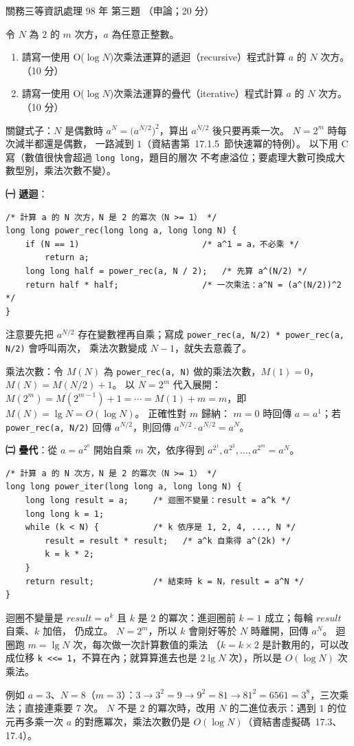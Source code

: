 \begin{pastexam}[label={px:gw3-098-ds-03}]{關務三等資訊處理 98 年 第三題}
（申論；20 分）

令 $N$ 為 2 的 $m$ 次方，$a$ 為任意正整數。
\begin{enumerate}[leftmargin=2.6em, labelsep=0.4em]
\item[㈠] 請寫一使用 O($\log N$)次乘法運算的遞迴（recursive）程式計算 $a$ 的 $N$ 次方。（10 分）
\item[㈡] 請寫一使用 O($\log N$)次乘法運算的疊代（iterative）程式計算 $a$ 的 $N$ 次方。（10 分）
\end{enumerate}
\end{pastexam}

\begin{pastsoln}
關鍵式子：$N$ 是偶數時 $a^N = \bigl(a^{N/2}\bigr)^2$，算出 $a^{N/2}$ 後只要再乘一次。 $N = 2^m$ 時每次減半都還是偶數，
一路減到 $1$（資結書第~17.1.5~節快速冪的特例）。 以下用 C 寫（數值很快會超過 \texttt{long long}，題目的層次
不考慮溢位；要處理大數可換成大數型別，乘法次數不變）。

\textbf{㈠ 遞迴}：
\begin{verbatim}
/* 計算 a 的 N 次方，N 是 2 的冪次（N >= 1） */
long long power_rec(long long a, long long N) {
    if (N == 1)                         /* a^1 = a，不必乘 */
        return a;
    long long half = power_rec(a, N / 2);   /* 先算 a^(N/2) */
    return half * half;                 /* 一次乘法：a^N = (a^(N/2))^2 */
}
\end{verbatim}
注意要先把 $a^{N/2}$ 存在變數裡再自乘；寫成 \texttt{power\_rec(a, N/2) * power\_rec(a, N/2)} 會呼叫兩次，
乘法次數變成 $N - 1$，就失去意義了。

乘法次數：令 $M(N)$ 為 \texttt{power\_rec(a, N)} 做的乘法次數，$M(1) = 0$，$M(N) = M(N/2) + 1$。 以 $N = 2^m$
代入展開：$M(2^m) = M(2^{m-1}) + 1 = \cdots = M(1) + m = m$，即 $M(N) = \lg N = O(\log N)$。 正確性對 $m$ 歸納：
$m = 0$ 時回傳 $a = a^1$；若 \texttt{power\_rec(a, N/2)} 回傳 $a^{N/2}$，則回傳 $a^{N/2} \cdot a^{N/2} = a^N$。

\textbf{㈡ 疊代}：從 $a = a^{2^0}$ 開始自乘 $m$ 次，依序得到 $a^{2^1}, a^{2^2}, \ldots, a^{2^m} = a^N$。
\begin{verbatim}
/* 計算 a 的 N 次方，N 是 2 的冪次（N >= 1） */
long long power_iter(long long a, long long N) {
    long long result = a;     /* 迴圈不變量：result = a^k */
    long long k = 1;
    while (k < N) {           /* k 依序是 1, 2, 4, ..., N */
        result = result * result;   /* a^k 自乘得 a^(2k) */
        k = k * 2;
    }
    return result;            /* 結束時 k = N，result = a^N */
}
\end{verbatim}
迴圈不變量是 $\mathit{result} = a^k$ 且 $k$ 是 $2$ 的冪次：進迴圈前 $k = 1$ 成立；每輪 $\mathit{result}$ 自乘、$k$ 加倍，
仍成立。 $N = 2^m$，所以 $k$ 會剛好等於 $N$ 時離開，回傳 $a^N$。 迴圈跑 $m = \lg N$ 次，每次做一次計算數值的乘法
（$k = k \times 2$ 是計數用的，可以改成位移 \texttt{k <<= 1}，不算在內；就算算進去也是 $2\lg N$ 次），所以是
$O(\log N)$ 次乘法。

例如 $a = 3$、$N = 8$（$m = 3$）：$3 \to 3^2 = 9 \to 9^2 = 81 \to 81^2 = 6561 = 3^8$，三次乘法；直接連乘要 $7$ 次。
$N$ 不是 $2$ 的冪次時，改用 $N$ 的二進位表示：遇到 $1$ 的位元再多乘一次 $a$ 的對應冪次，乘法次數仍是
$O(\log N)$（資結書虛擬碼~17.3、17.4）。
\end{pastsoln}

